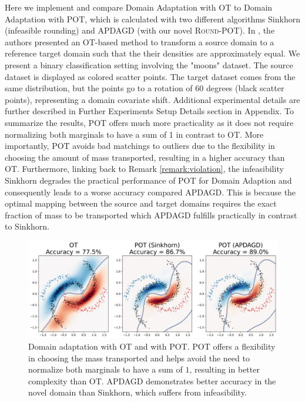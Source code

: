Here we implement and compare Domain Adaptation with OT to Domain Adaptation with POT, which is calculated with two different algorithms Sinkhorn (infeasible rounding) and APDAGD (with our novel \textsc{Round-POT}). In \citep{courty2017joint}, the authors presented an OT-based method to transform a source domain to a reference target domain such that the their densities are approximately equal. We present a binary classification setting involving the "moons" dataset. The source dataset is displayed as colored scatter points. The target dataset comes from the same distribution, but the points go to a rotation of 60 degrees (black scatter points), representing a domain covariate shift. Additional experimental details are further described in Further Experiments Setup Details section in Appendix. %
To summarize the results, POT offers much more practicality as it does not require normalizing both marginals to have a sum of 1 in contrast to OT. More importantly, POT avoids bad matchings to outliers due to the flexibility in choosing the amount of mass transported, resulting in a higher accuracy than OT. Furthermore, linking back to Remark \ref{remark:violation}, the infeasibility Sinkhorn degrades the practical performance of POT for Domain Adaption and consequently leads to a worse accuracy compared APDAGD. This is because the optimal mapping between the source and target domains requires the exact fraction of mass to be transported which APDAGD fulfills practically in contrast to Sinkhorn.  

\begin{figure}
    \centering
    \includegraphics[width=1\linewidth]{figs/POT_vs_OT.png}
    \caption{Domain adaptation with OT and with POT. POT offers a flexibility in choosing the mass transported and helps avoid the need to normalize both marginals to have a sum of $1$, resulting in better complexity than OT. APDAGD demonstrates better accuracy in the novel domain than Sinkhorn, which suffers from infeasibility.}
    \label{fig:POT_vs_OT}
\end{figure}

